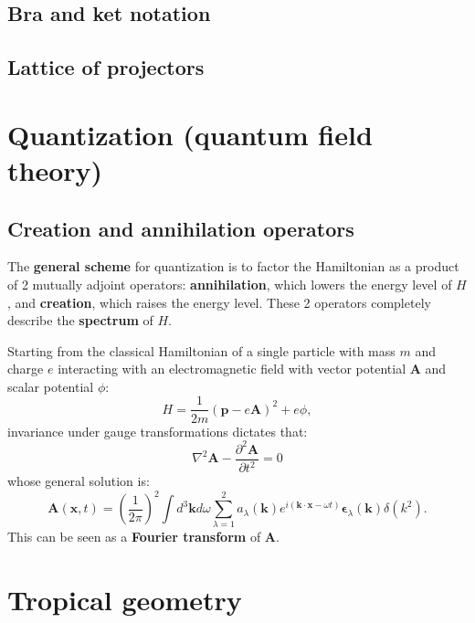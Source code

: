 \documentclass[orivec]{llncs}
\newcommand{\vect}[1]{\boldsymbol{#1}}
\begin{document}
\subsection{Bra and ket notation}

\subsection{Lattice of projectors}



\section{Quantization (quantum field theory)}

\subsection{Creation and annihilation operators}

The \textbf{general scheme} for quantization is to factor the Hamiltonian as a product of 2 mutually adjoint operators:  \textbf{annihilation}, which lowers the energy level of $H$, and \textbf{creation}, which raises the energy level.  These 2 operators completely describe the \textbf{spectrum} of $H$.

Starting from the classical Hamiltonian of a single particle with mass $m$ and charge $e$ interacting with an electromagnetic field with vector potential $\vect{A}$ and scalar potential $\phi$:
\begin{equation}
H = \frac{1}{2 m} (\vect{p} - e \vect{A})^2 + e \phi ,
\end{equation}
invariance under gauge transformations dictates that:
\begin{equation}
\nabla^2 \vect{A} - \frac{\partial^2 \vect{A}}{\partial t^2} = 0
\end{equation}
whose general solution is:
\begin{equation}
\vect{A}(\vect{x}, t) = (\frac{1}{2 \pi})^2 \int d^3\vect{k} d\omega \sum_{\lambda = 1}^{2} a_{\lambda}(\vect{k}) e^{i (\vect{k} \cdot \vect{x} - \omega t)} \vect{\epsilon}_{\lambda}(\vect{k}) \delta({k^2}) .
\end{equation}
This can be seen as a \textbf{Fourier transform} of $\vect{A}$.

\section{Tropical geometry}
\end{document}
